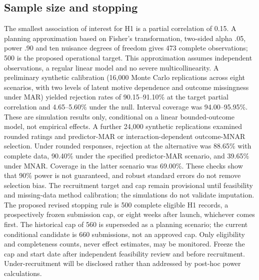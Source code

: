 \documentclass[11pt,a4paper]{article}
\begin{document}
\subsection{Sample size and stopping}
The smallest association of interest for H1 is a partial correlation of 0.15. A planning approximation based on Fisher's transformation, two-sided alpha .05, power .90 and ten nuisance degrees of freedom gives 473 complete observations; 500 is the proposed operational target. This approximation assumes independent observations, a regular linear model and no severe multicollinearity. A preliminary synthetic calibration (16,000 Monte Carlo replications across eight scenarios, with two levels of latent motive dependence and outcome missingness under MAR) yielded rejection rates of 90.15--91.10\% at the target partial correlation and 4.65--5.60\% under the null. Interval coverage was 94.00--95.95\%. These are simulation results only, conditional on a linear bounded-outcome model, not empirical effects. A further 24,000 synthetic replications examined rounded ratings and predictor-MAR or interaction-dependent outcome-MNAR selection. Under rounded responses, rejection at the alternative was 88.65\% with complete data, 90.40\% under the specified predictor-MAR scenario, and 39.65\% under MNAR. Coverage in the latter scenario was 69.00\%. These checks show that 90\% power is not guaranteed, and robust standard errors do not remove selection bias. The recruitment target and cap remain provisional until feasibility and missing-data method calibration; the simulations do not validate imputation. The proposed revised stopping rule is 500 complete eligible H1 records, a prospectively frozen submission cap, or eight weeks after launch, whichever comes first. The historical cap of 560 is superseded as a planning scenario; the current conditional candidate is 660 submissions, not an approved cap. Only eligibility and completeness counts, never effect estimates, may be monitored. Freeze the cap and start date after independent feasibility review and before recruitment. Under-recruitment will be disclosed rather than addressed by post-hoc power calculations.
\end{document}
